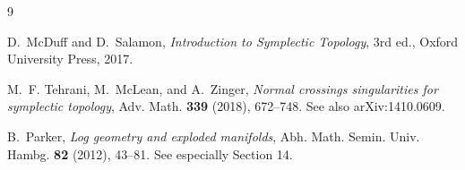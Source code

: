 \documentclass[11pt]{article}
\begin{document}
\begin{thebibliography}{9}

D.~McDuff and D.~Salamon,
\emph{Introduction to Symplectic Topology},
3rd ed., Oxford University Press, 2017.

M.~F. Tehrani, M.~McLean, and A.~Zinger,
\emph{Normal crossings singularities for symplectic topology},
Adv. Math. \textbf{339} (2018), 672--748.
See also arXiv:1410.0609.

B.~Parker,
\emph{Log geometry and exploded manifolds},
Abh. Math. Semin. Univ. Hambg. \textbf{82} (2012), 43--81.
See especially Section 14.

\end{thebibliography}
\end{document}
